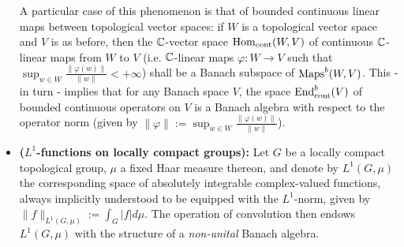 \begin{example}
\begin{itemize}
                A particular case of this phenomenon is that of bounded continuous linear maps between topological vector spaces: if $W$ is a topological vector space and $V$ is as before, then the $\mathbb{C}$-vector space $\mathrm{Hom}_{\mathrm{cont}}(W, V)$ of continuous $\mathbb{C}$-linear maps from $W$ to $V$ (i.e. $\mathbb{C}$-linear maps $\varphi: W \to V$ such that $\sup_{w \in W} \frac{\|\varphi(w)\|}{\|w\|} < +\infty$) shall be a Banach subspace of $\mathrm{Maps}^b(W, V)$. This - in turn - implies that for any Banach space $V$, the space $\mathrm{End}_{\mathrm{cont}}^b(V)$ of bounded continuous operators on $V$ is a Banach algebra with respect to the operator norm (given by $\|\varphi\| := \sup_{w \in W} \frac{\|\varphi(w)\|}{\|w\|}$). 
                \item \textbf{($L^1$-functions on locally compact groups):} Let $G$ be a locally compact topological group, $\mu$ a fixed Haar measure thereon, and denote by $L^1(G, \mu)$ the corresponding space of absolutely integrable complex-valued functions, always implicitly understood to be equipped with the $L^1$-norm, given by $\|f\|_{L^1(G, \mu)} := \int_G |f| d\mu$. The operation of convolution then endows $L^1(G, \mu)$ with the structure of a \textit{non-unital} Banach algebra.
            \end{itemize}
        \end{example}
        
